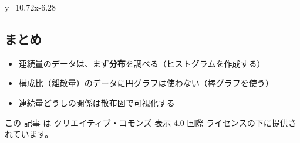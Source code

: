 \documentclass[]{article}
\providecommand{\tightlist}{%
  \setlength{\itemsep}{0pt}\setlength{\parskip}{0pt}}
\begin{document}
y=10.72x-6.28

\hypertarget{-2}{%
\subsection{まとめ}\label{-2}}

\begin{itemize}
\tightlist
\item
  連続量のデータは、まず\textbf{分布}を調べる（ヒストグラムを作成する）
\item
  構成比（離散量）のデータに円グラフは使わない（棒グラフを使う）
\item
  連続量どうしの関係は散布図で可視化する
\end{itemize}

この 記事 は クリエイティブ・コモンズ 表示 4.0 国際
ライセンスの下に提供されています。
\end{document}
